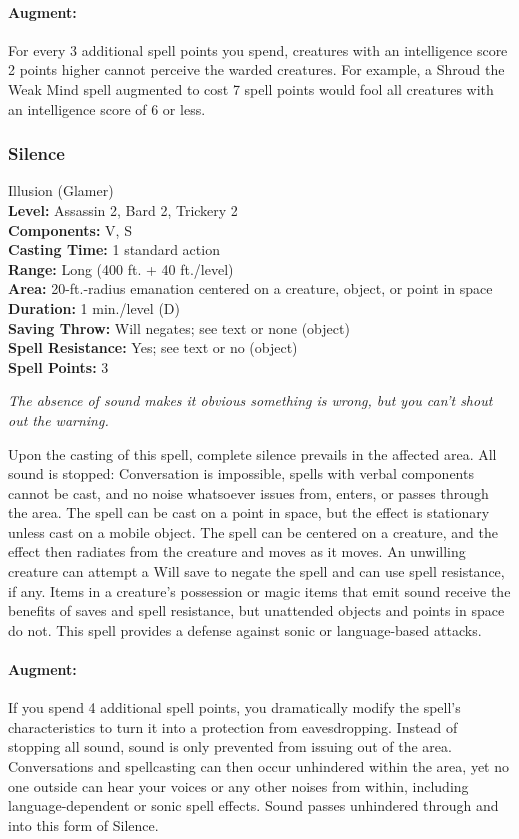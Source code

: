 \paragraph{Augment:} For every 3 additional spell points you spend, creatures with an intelligence score 2 points higher cannot perceive the warded creatures. For example, a Shroud the Weak Mind spell augmented to cost 7 spell points would fool all creatures with an intelligence score of 6 or less.

\subsubsection{Silence}
\label{Spell:Silence}
Illusion (Glamer)
\\ \textbf{Level:} Assassin 2, Bard 2, Trickery 2
\\ \textbf{Components:} V, S
\\ \textbf{Casting Time:} 1 standard action
\\ \textbf{Range:} Long (400 ft. + 40 ft./level)
\\ \textbf{Area:} 20-ft.-radius emanation centered on a creature, object, or point in space
\\ \textbf{Duration:} 1 min./level (D)
\\ \textbf{Saving Throw:} Will negates; see text or none (object)
\\ \textbf{Spell Resistance:} Yes; see text or no (object)
\\ \textbf{Spell Points:} 3

\emph{The absence of sound makes it obvious something is wrong, but you can't shout out the warning.}

Upon the casting of this spell, complete silence prevails in the affected area. 
All sound is stopped: Conversation is impossible, spells with verbal components cannot be cast, and no noise whatsoever issues from, enters, or passes through the area. 
The spell can be cast on a point in space, but the effect is stationary unless cast on a mobile object. 
The spell can be centered on a creature, and the effect then radiates from the creature and moves as it moves. 
An unwilling creature can attempt a Will save to negate the spell and can use spell resistance, if any. 
Items in a creature's possession or magic items that emit sound receive the benefits of saves and spell resistance, but unattended objects and points in space do not. 
This spell provides a defense against sonic or language-based attacks.

\paragraph{Augment:} If you spend 4 additional spell points, you dramatically modify the spell's characteristics to turn it into a protection from eavesdropping.
 Instead of stopping all sound, sound is only prevented from issuing out of the area. Conversations and spellcasting can then occur unhindered within the area, yet no one outside can hear your voices or any other noises from within, including language-dependent or sonic spell effects. Sound passes unhindered through and into this form of Silence.
